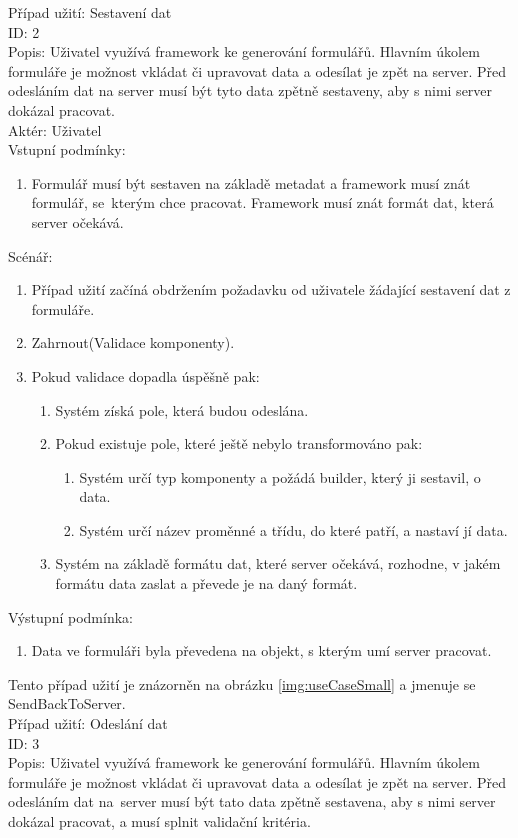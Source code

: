 Případ užití: Sestavení dat\\
ID: 2\\
Popis: 
Uživatel využívá framework ke generování formulářů. Hlavním úkolem formuláře je možnost vkládat či upravovat data a odesílat je zpět na server. Před odesláním dat na server musí být tyto data zpětně sestaveny, aby s nimi server dokázal pracovat.
\\
Aktér: Uživatel\\
Vstupní podmínky:
\begin{enumerate}
\item Formulář musí být sestaven na základě metadat a framework musí znát formulář, se~kterým chce pracovat. Framework musí znát formát dat, která server očekává.
\end{enumerate}
Scénář:
\begin{enumerate}
\item Případ užití začíná obdržením požadavku od uživatele žádající sestavení dat z formuláře.
\item Zahrnout(Validace komponenty).
\item Pokud validace dopadla úspěšně pak:
\begin{enumerate}
\item Systém získá pole, která budou odeslána.
\item Pokud existuje pole, které ještě nebylo transformováno pak:
\begin{enumerate}
\item Systém určí typ komponenty a požádá builder, který ji sestavil, o data.
\item Systém určí název proměnné a třídu, do které patří, a nastaví jí data.
\end {enumerate}
\item Systém na základě formátu dat, které server očekává, rozhodne, v jakém formátu data zaslat a převede je na daný formát.
\end{enumerate}
\end{enumerate}
Výstupní podmínka:
\begin{enumerate}
\item Data ve formuláři byla převedena na objekt, s kterým umí server pracovat.
\end{enumerate}
Tento případ užití je znázorněn na obrázku \ref{img:useCaseSmall} a jmenuje se SendBackToServer.\\
Případ užití: Odeslání dat\\
ID: 3\\
Popis: 
Uživatel využívá framework ke generování formulářů. Hlavním úkolem formuláře je možnost vkládat či upravovat data a odesílat je zpět na server. Před odesláním dat na~server musí být tato data zpětně sestavena, aby s nimi server dokázal pracovat, a musí splnit validační kritéria.
